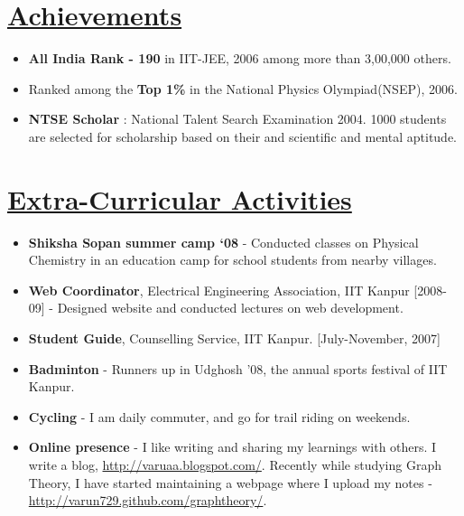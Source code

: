\documentclass[10pt]{article}
\newcommand{\sectionhead}[1]{%
\section*{\underline{#1}}
}
\begin{document}
%
%
\sectionhead{Achievements}
\begin{itemize}[itemsep=0pt]
\item {\bf All India Rank - 190} in IIT-JEE, 2006 among more than 3,00,000 others.
\item Ranked among the {\bf Top 1\%} in the National Physics Olympiad(NSEP), 2006.
\item {\bf NTSE Scholar} : National Talent Search Examination 2004. 1000 students are selected for scholarship based on their and scientific and mental aptitude.
\end{itemize}


%
%
\sectionhead{Extra-Curricular Activities}
\begin{itemize}[itemsep=0pt]
	\item \textbf{Shiksha Sopan summer camp `08} - Conducted classes on Physical Chemistry in an education camp for school students from nearby villages.
	\item \textbf{Web Coordinator}, Electrical Engineering Association, IIT Kanpur [2008-09] - Designed website and  conducted lectures on web development.
	\item \textbf{Student Guide}, Counselling Service, IIT Kanpur. [July-November, 2007]
	\item \textbf{Badminton} - Runners up in Udghosh '08, the annual sports festival of IIT Kanpur. 
	\item \textbf{Cycling} - I am daily commuter, and go for trail riding on weekends.
	\item \textbf{Online presence} - I like writing and sharing my learnings with others. I write a blog, \url{http://varuaa.blogspot.com/}. Recently while studying Graph Theory, I have started maintaining a webpage where I upload my notes - \url{http://varun729.github.com/graphtheory/}.
\end{itemize}


%
%


%
%
\end{document}
